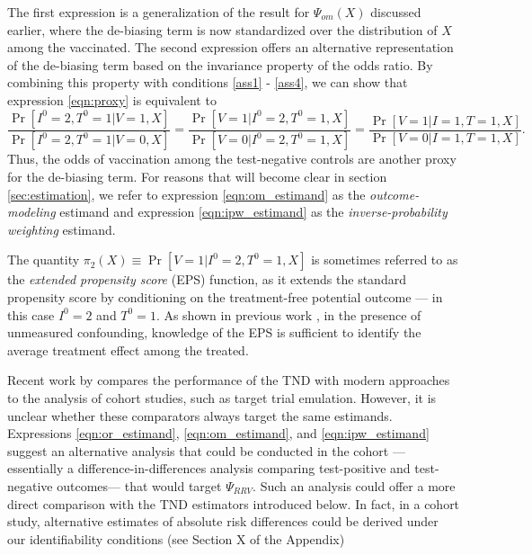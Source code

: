 \documentclass[11pt]{article}
\begin{document}
The first expression is a generalization of the result for $\Psi_{om}(X)$ discussed earlier, where the de-biasing term is now standardized over the distribution of $X$ among the vaccinated. The second expression offers an alternative representation of the de-biasing term based on the invariance property of the odds ratio. By combining this property with conditions \ref{ass1} - \ref{ass4}, we can show that expression \ref{eqn:proxy} is equivalent to
$$\frac{\Pr[I^0 = 2,  T^0 = 1| V = 1, X]}{\Pr[I^0 = 2,  T^0 = 1 | V = 0, X]} = \frac{\Pr[V = 1 | I^0 = 2, T^0 = 1, X]}{\Pr[V = 0 | I^0 = 2, T^0 = 1, X]} =\frac{\Pr[V = 1 | I = 1, T = 1, X]}{\Pr[V = 0 | I = 1, T = 1, X]}.$$
Thus, the odds of vaccination among the test-negative controls are another proxy for the de-biasing term. For reasons that will become clear in section \ref{sec:estimation}, we refer to expression \ref{eqn:om_estimand} as the \textit{outcome-modeling} estimand and expression \ref{eqn:ipw_estimand} as the \textit{inverse-probability weighting} estimand.

\begin{remark}
The quantity $\pi_2(X) \equiv \Pr[V = 1 | I^0 = 2, T^0 = 1, X]$ is sometimes referred to as the \textit{extended propensity score} (EPS) function, as it extends the standard propensity score by conditioning on the treatment-free potential outcome --- in this case $I^0 = 2$ and $T^0 = 1$. As shown in previous work \cite{tchetgen_single_2023}, in the presence of unmeasured confounding, knowledge of the EPS is sufficient to identify the average treatment effect among the treated. 
\end{remark}

\begin{remark}
Recent work by \textcite{li2024comparison} compares the performance of the TND with modern approaches to the analysis of cohort studies, such as target trial emulation. However, it is unclear whether these comparators always target the same estimands. Expressions \ref{eqn:or_estimand}, \ref{eqn:om_estimand}, and \ref{eqn:ipw_estimand} suggest an alternative analysis that could be conducted in the cohort ---essentially a difference-in-differences analysis comparing test-positive and test-negative outcomes--- that would target $\Psi_{RRV}$. Such an analysis could offer a more direct comparison with the TND estimators introduced below. In fact, in a cohort study, alternative estimates of absolute risk differences could be derived under our identifiability conditions (see Section X of the Appendix)
\end{remark}
\end{document}
